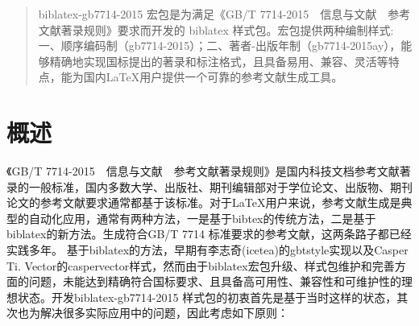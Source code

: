 \documentclass[11pt]{article} %
\begin{document}



\pagestyle{plain}




\titleandauthor

\begin{quotation}
biblatex-gb7714-2015 宏包是为满足《GB/T 7714-2015~~信息与文献~~参考文献著录规则》要求而开发的 biblatex 样式包。宏包提供两种编制样式: 一、顺序编码制（gb7714-2015）；二、著者-出版年制（gb7714-2015ay），能够精确地实现国标提出的著录和标注格式，且具备易用、兼容、灵活等特点，能为国内\LaTeX{}用户提供一个可靠的参考文献生成工具。
\end{quotation}
\tableofcontents

\listoffigures
\listoftables
\listofegcode
\newlength{\textparwd}

\newpage
{}
\pagestyle{fancy}
\section{概述}

《GB/T 7714-2015~~信息与文献~~参考文献著录规则》是国内科技文档参考文献著录的一般标准，国内多数大学、出版社、期刊编辑部对于学位论文、出版物、期刊论文的参考文献要求通常都基于该标准。对于\LaTeX{}用户来说，参考文献生成是典型的自动化应用，通常有两种方法，一是基于bibtex的传统方法，二是基于biblatex的新方法。生成符合GB/T 7714 标准要求的参考文献，这两条路子都已经实践多年。
基于biblatex的方法，早期有李志奇(icetea)的gbtstyle实现以及Casper Ti. Vector的caspervector样式，然而由于biblatex宏包升级、样式包维护和完善方面的问题，未能达到精确符合国标要求、且具备高可用性、兼容性和可维护性的理想状态。开发biblatex-gb7714-2015 样式包的初衷首先是基于当时这样的状态，其次也为解决很多实际应用中的问题，因此考虑如下原则：
\end{document}
